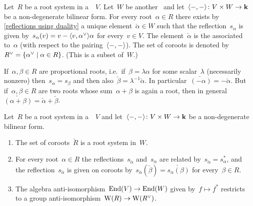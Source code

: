 \begin{definition}
  Let~$R$ be a root system in a~{\vectorspace{$\kf$}}~$V$.
  Let~$W$ be another~{\vectorspace{$\kf$}} and let~$\langle-,-\rangle \colon V \times W \to \mathbf{k}$ be a non-degenerate bilinear form.
  For every root~$\alpha \in R$ there exists by \cref{reflections using duality} a unique element~$\check{\alpha} \in W$ such that the reflection~$s_\alpha$ is given by~$s_\alpha(v) = v - \pair{v, \check{\alpha}} \alpha$ for every~$v \in V$.
  The element~$\check{\alpha}$ is the  associated to~$\alpha$ (with respect to the pairing~$\langle-,-\rangle$).
  The set of coroots is denoted by~$\check{R} = \{\check{\alpha} \suchthat \alpha \in R\}$.
  (This is a subset of~$W$.)
\end{definition}


\begin{remark}
  If~$\alpha, \beta \in R$ are proportional roots, i.e.\ if~$\beta = \lambda \alpha$ for some scalar~$\lambda$ (necessarily nonzero) then~$s_\alpha = s_\beta$ and then also~$\check{\beta} = \lambda^{-1} \check{\alpha}$.
  In particular~$\check{(-\alpha)} = -\check{\alpha}$.
  But if~$\alpha, \beta \in R$ are two roots whose sum~$\alpha + \beta$ is again a root, then in general~$\check{(\alpha + \beta)} = \check{\alpha} + \check{\beta}$.
\end{remark}




\begin{proposition}
  \label{dual root system}
  Let~$R$ be a root system in a~{\vectorspace{$\kf$}}~$V$ and let~$\langle-,-\rangle \colon V \times W \to \mathbf{k}$ be a non-degenerate bilinear form.
  \begin{enumerate}
    \item
      \label{coroots are a root system}
      The set of coroots~$\check{R}$ is a root system in~$W$.
    \item
      \label{description of dual reflections}
      For every root~$\alpha \in R$ the reflections~$s_{\check{\alpha}}$ and~$s_\alpha$ are related by~$s_{\check{\alpha}} = s_\alpha^*$, and the reflection~$s_{\check{\alpha}}$ is given on coroots by~$s_{\check{\alpha}}(\check{\beta}) = \check{s_\alpha(\beta)}$ for every~$\beta \in R$.
    \item
      \label{antiisomorphism of weyl groups}
      The algebra anti-isomorphism~$\operatorname{End}(V) \to \operatorname{End}(W)$ given by~$f \mapsto f^*$ restricts to a group anti-isomorphism~$\Weyl(R) \to \Weyl(\check{R})$.
  \end{enumerate}
\end{proposition}


